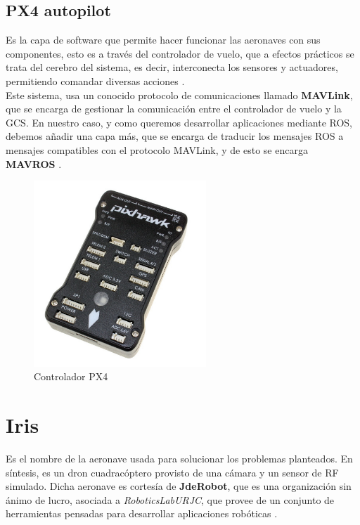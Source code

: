 \subsection{PX4 autopilot}
\label{subsec:px4}

Es la capa de software que permite hacer funcionar las aeronaves con sus componentes, esto es a través del controlador de vuelo, que a efectos prácticos se trata del cerebro del sistema, es decir, interconecta los sensores y actuadores, permitiendo comandar diversas acciones \cite{flight-controller} \cite{px4-def}.\\

Este sistema, usa un conocido protocolo de comunicaciones llamado \textbf{MAVLink}, que se encarga de gestionar la comunicación entre el controlador de vuelo y la \ac{GCS}. En nuestro caso, y como queremos desarrollar aplicaciones mediante \ac{ROS}, debemos añadir una capa más, que se encarga de traducir los mensajes ROS a mensajes compatibles con el protocolo MAVLink, y de esto se encarga \textbf{MAVROS} \cite{px4-mavlink} \cite{px4-mavros}.\\

\begin{figure} [H]
	\begin{center}
	\includegraphics[height=7cm]{imagenes/cap3/7_px4_logo.png}
	\end{center}
	\caption[Controlador PX4]{Controlador PX4}
	\label{fig:px4autopilot}
\end{figure}

\section{Iris}
\label{sec:iris}

Es el nombre de la aeronave usada para solucionar los problemas planteados. En síntesis, es un dron cuadracóptero provisto de una cámara y un sensor de \ac{RF} simulado. Dicha aeronave es cortesía de \textbf{JdeRobot}, que es una organización sin ánimo de lucro, asociada a \emph{RoboticsLabURJC}, que provee de un conjunto de herramientas pensadas para desarrollar aplicaciones robóticas \cite{jderobot-ref}.\\

